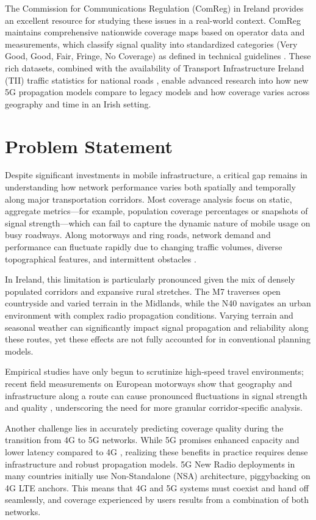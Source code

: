 \documentclass[MScCS]{uccthesis}
\begin{document}
The Commission for Communications Regulation (ComReg) in Ireland provides an excellent resource for studying these issues in a real-world context. ComReg maintains comprehensive nationwide coverage maps based on operator data and measurements, which classify signal quality into standardized categories (Very Good, Good, Fair, Fringe, No Coverage) as defined in technical guidelines \cite{comreg_plum_21118}. These rich datasets, combined with the availability of Transport Infrastructure Ireland (TII) traffic statistics for national roads \cite{tii2024indicators}, enable advanced research into how new 5G propagation models compare to legacy models and how coverage varies across geography and time in an Irish setting.

\section{Problem Statement}

Despite significant investments in mobile infrastructure, a critical gap remains in understanding how network performance varies both spatially and temporally along major transportation corridors. Most coverage analysis focus on static, aggregate metrics---for example, population coverage percentages or snapshots of signal strength---which can fail to capture the dynamic nature of mobile usage on busy roadways. Along motorways and ring roads, network demand and performance can fluctuate rapidly due to changing traffic volumes, diverse topographical features, and intermittent obstacles \cite{tsoulos2024highway}.

In Ireland, this limitation is particularly pronounced given the mix of densely populated corridors and expansive rural stretches. The M7 traverses open countryside and varied terrain in the Midlands, while the N40 navigates an urban environment with complex radio propagation conditions. Varying terrain and seasonal weather can significantly impact signal propagation and reliability along these routes, yet these effects are not fully accounted for in conventional planning models.

Empirical studies have only begun to scrutinize high-speed travel environments; recent field measurements on European motorways show that geography and infrastructure along a route can cause pronounced fluctuations in signal strength and quality \cite{tsoulos2024highway}, underscoring the need for more granular corridor-specific analysis.

Another challenge lies in accurately predicting coverage quality during the transition from 4G to 5G networks. While 5G promises enhanced capacity and lower latency compared to 4G \cite{tsoulos2024highway}, realizing these benefits in practice requires dense infrastructure and robust propagation models. 5G New Radio deployments in many countries initially use Non-Standalone (NSA) architecture, piggybacking on 4G LTE anchors. This means that 4G and 5G systems must coexist and hand off seamlessly, and coverage experienced by users results from a combination of both networks.
\end{document}
